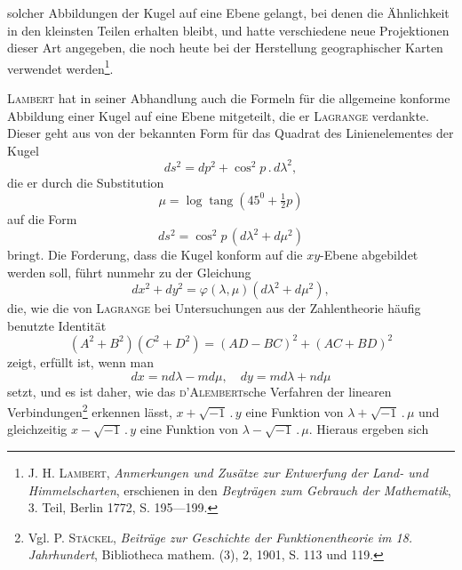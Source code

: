 solcher Abbildungen der Kugel auf eine Ebene gelangt, bei denen die Ähnlichkeit
in den kleinsten Teilen erhalten bleibt, und hatte verschiedene neue
Projektionen dieser Art angegeben, die noch heute bei der Herstellung geographischer
Karten verwendet werden\footnote{J. H. \textsc{Lambert}, \textit{Anmerkungen und Zusätze zur Entwerfung der Land- und Himmelscharten}, erschienen in den \textit{Beyträgen zum Gebrauch der Mathematik}, 3. Teil, Berlin 1772, S. 195—199.}.
\par
\textsc{Lambert} hat in seiner Abhandlung auch die Formeln für die allgemeine
konforme Abbildung einer Kugel auf eine Ebene mitgeteilt, die er \textsc{Lagrange}
verdankte. Dieser geht aus von der bekannten Form für das Quadrat des
Linienelementes der Kugel
\begin{equation}ds^2=dp^2+\cos^2 p\mathbin{.}d\lambda^2,\tag*{(1)}\end{equation}
\noindent die er durch die Substitution
\begin{equation}\mu=\log\operatorname{tang}(45^0+\tfrac12 p)\tag*{(2)}\end{equation}
\noindent auf die Form
\begin{equation}ds^2=\cos^2 p\,(d\lambda^2+d\mu^2)\tag*{(3)}\end{equation}
\noindent bringt. Die Forderung, dass die Kugel konform auf die \(xy\)-Ebene abgebildet
werden soll, führt nunmehr zu der Gleichung
\begin{equation}dx^2+dy^2=\varphi(\lambda,\mu)(d\lambda^2+d\mu^2),\tag*{(4)}\end{equation}
\noindent die, wie die von \textsc{Lagrange} bei Untersuchungen aus der Zahlentheorie häufig
benutzte Identität
\begin{equation}(A^2+B^2)(C^2+D^2)=(AD-BC)^2+(AC+BD)^2\tag*{(5)}\end{equation}
\noindent zeigt, erfüllt ist, wenn man
\begin{equation}dx=nd\lambda-md\mu,\quad dy=md\lambda+nd\mu\tag*{(6)}\end{equation}
\noindent setzt, und es ist daher, wie das \textsc{d’Alembert}sche Verfahren der linearen Verbindungen\footnote{Vgl. P. \textsc{Stäckel}, \textit{Beiträge zur Geschichte der Funktionentheorie im 18. Jahrhundert}, Bibliotheca mathem. (3), 2, 1901, S. 113 und 119.}
erkennen lässt, \(x+\sqrt{-1}\mathbin{.}y\) eine Funktion von \(\lambda+\sqrt{-1}\mathbin{.}\mu\) und
\clearpage{}\setcounter{footnote}{0}
\noindent gleichzeitig \(x-\sqrt{-1}\mathbin{.}y\) eine Funktion von \(\lambda-\sqrt{-1}\mathbin{.}\mu\). Hieraus ergeben sich

